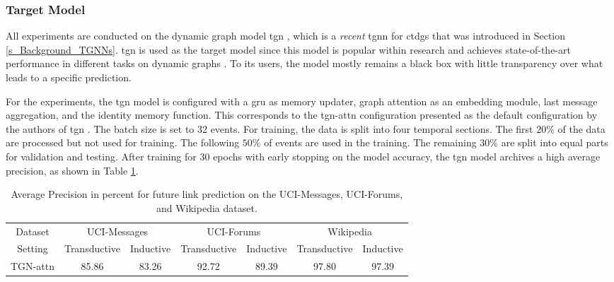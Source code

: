 \subsubsection{Target Model}
\label{s_Evaluation_Setup_TargetModel}

All experiments are conducted on the dynamic graph model \gls{tgn} \cite{rossi_temporal_2020}, which is a \textit{recent} \gls{tgnn} for \glspl{ctdg} that was introduced in Section \ref{s_Background_TGNNs}. \gls{tgn} is used as the target model since this model is popular within research \cite{souza_provably_2022} and achieves state-of-the-art performance in different tasks on dynamic graphs \cite{rossi_temporal_2020, souza_provably_2022}. To its users, the model mostly remains a black box with little transparency over what leads to a specific prediction.

For the experiments, the \gls{tgn} model is configured with a \gls{gru} as memory updater, graph attention as an embedding module, last message aggregation, and the identity memory function. This corresponds to the \gls{tgn}-attn configuration presented as the default configuration by the authors of \gls{tgn} \cite{rossi_temporal_2020}. The batch size is set to 32 events. For training, the data is split into four temporal sections. The first $20\%$ of the data are processed but not used for training. The following $50\%$ of events are used in the training. The remaining $30\%$ are split into equal parts for validation and testing. After training for $30$ epochs with early stopping on the model accuracy, the \gls{tgn} model archives a high average precision, as shown in Table \ref{t_TGNTrainingPerformance}.

\begin{table}[ht]
    \small
    \centering
    \begin{tabular}{ccccccc}
    \hline
         Dataset &  \multicolumn{2}{c}{UCI-Messages} & \multicolumn{2}{c}{UCI-Forums}&  \multicolumn{2}{c}{Wikipedia}\\
         Setting &  Transductive&  Inductive & Transductive&  Inductive&  Transductive& Inductive\\
    \hline
         TGN-attn& 85.86 & 83.26 & 92.72&  89.39&  97.80& 97.39\\
    \hline
    \end{tabular}
    \caption{Average Precision in percent for future link prediction on the UCI-Messages, UCI-Forums, and Wikipedia dataset.}
    \label{t_TGNTrainingPerformance}
\end{table}

